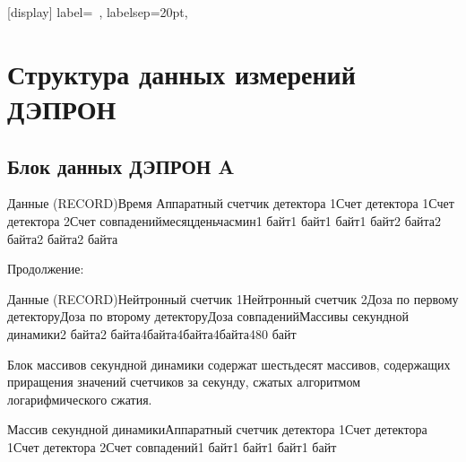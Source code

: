 \appendix
\sectionformat{\chapter}[display]{%
    label=\chaptertitlename\ \thechapter,%
    labelsep=20pt,
}
\renewcommand\thechapter{\Asbuk{chapter}} %



\chapter{Структура данных измерений ДЭПРОН} \label{Appendixa}

\section{Блок данных ДЭПРОН A}




{\small Данные (RECORD)Время Аппаратный счетчик детектора }{\small 1}{\small Счет детектора }{\small 1}{\small Счет детектора 2Счет совпадениймесяцденьчасмин1 байт1 байт1 байт1 байт2 байта2 байта2 байта2 байта}


Продолжение:


{\small Данные (RECORD)Нейтронный счетчик 1Нейтронный счетчик 2Доза по первому детекторуДоза по второму детекторуДоза совпаденийМассивы секундной динамики2 байта2 байта}{\small 4}{\small  байта}{\small 4}{\small  байта}{\small 4}{\small  байта480 байт}





Блок массивов секундной динамики содержат шестьдесят массивов, содержащих приращения значений счетчиков за секунду, сжатых алгоритмом логарифмического сжатия.





{\small Массив секундной динамикиАппаратный счетчик детектора }{\small 1}{\small Счет детектора }{\small 1}{\small Счет детектора 2Счет совпадений}1 байт1 байт1 байт1 байт


